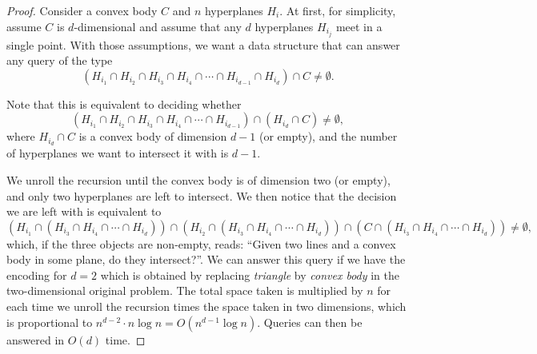 \begin{proof}
  Consider a convex body \(C\) and \(n\) hyperplanes \(H_i\).
  At first, for simplicity, assume \(C\) is \(d\)-dimensional and
  assume that any \(d\) hyperplanes \(H_{i_j}\) meet in a single point.
  With those assumptions,
  we want a data structure that can answer any query of the type
  \begin{displaymath}
    (H_{i_1} \cap H_{i_2} \cap H_{i_3} \cap H_{i_4} \cap \cdots \cap
    H_{i_{d-1}} \cap H_{i_d})
    \cap C
    \neq \emptyset.
  \end{displaymath}

  Note that this is equivalent to deciding whether
  \begin{displaymath}
    (H_{i_1} \cap H_{i_2} \cap H_{i_3} \cap H_{i_4} \cap \cdots \cap H_{i_{d-1}})
    \cap (H_{i_d} \cap C)
    \neq \emptyset,
  \end{displaymath}
  where \(H_{i_d} \cap C\) is a convex body of dimension \(d-1\) (or empty), and the
  number of hyperplanes we want to intersect it with is \(d-1\).

  We unroll the recursion until the convex body is of dimension two (or empty),
  and only two hyperplanes are left to intersect. We then notice that the decision we
  are left with is equivalent to
  \begin{displaymath}
    (H_{i_1} \cap (H_{i_3} \cap H_{i_4} \cap \cdots \cap H_{i_d}))
    \cap
    (H_{i_2} \cap (H_{i_3} \cap H_{i_4} \cap \cdots \cap H_{i_d}))
    \cap (C \cap (H_{i_3} \cap H_{i_4} \cap \cdots \cap H_{i_d}))
    \neq \emptyset,
  \end{displaymath}
  which, if the three objects are non-empty, reads:
  ``Given two lines and a convex body in some plane, do they intersect?''.
  We can answer this query if we have the encoding for \(d = 2\) which is
  obtained by replacing \emph{triangle} by \emph{convex body} in the
  two-dimensional original problem. The total space taken is multiplied by
  \(n\) for each time we unroll the recursion times the space taken in two
  dimensions, which is proportional to \(n^{d-2} \cdot n \log{n} = O(n^{d-1} \log{n}) \).
  Queries can then be answered in \(O(d)\) time.


\end{proof}
